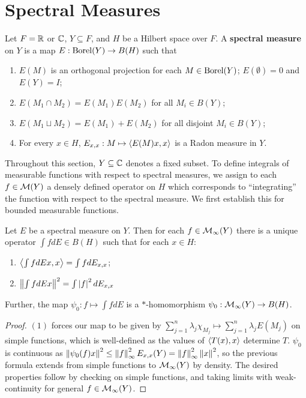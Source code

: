 \documentclass[10pt]{amsart}
\begin{document}
\section{Spectral Measures}
\begin{definition}
    Let $F = \mathbb{R}$ or $\mathbb{C}$, $Y \subseteq F$, and $H$ be a Hilbert space over $F$. A \textbf{spectral measure} on $Y$ is a map $E : \operatorname{Borel}(Y) \to B(H)$ such that
    \begin{enumerate}
        \item $E(M)$ is an orthogonal projection for each $M \in \operatorname{Borel}(Y)$; $E(\emptyset) = 0$ and $E(Y) = I$;
        \item $E(M_1 \cap M_2) = E(M_1)E(M_2)$ for all $M_i \in B(Y)$;
        \item $E(M_1 \sqcup M_2) = E(M_1) + E(M_2)$ for all disjoint $M_i \in B(Y)$;
        \item For every $x \in H$, $E_{x, x} : M \mapsto \left\langle E(M)x, x \right\rangle$ is a Radon measure in $Y$.
    \end{enumerate}
\end{definition}
Throughout this section, $Y \subseteq \mathbb{C}$ denotes a fixed subset. To define integrals of measurable functions with respect to spectral measures, we assign to each $f \in \mathcal{M}(Y)$ a densely defined operator on $H$ which corresponds to ``integrating'' the function with respect to the spectral measure. We first establish this for bounded measurable functions.
\begin{lemma}\label{bdint}
    Let $E$ be a spectral measure on $Y$. Then for each $f \in \mathcal{M}_\infty(Y)$ there is a unique operator $\int f dE \in B(H)$ such that for each $x \in H$:
    \begin{enumerate}
        \item $\left\langle \int f dEx, x \right\rangle = \int f dE_{x, x}$;
        \item $\left\| \int f dE x \right\|^2 = \int\left| f \right|^2 dE_{x, x}$
    \end{enumerate}
    Further, the map $\psi_0 : f \mapsto \int f dE$ is a $*$-homomorphism $\psi_0 : \mathcal{M}_\infty(Y) \to B(H)$.
\end{lemma}
\begin{proof}
    $(1)$ forces our map to be given by $\sum_{j = 1}^n \lambda_j \chi_{M_j} \mapsto \sum_{j = 1}^n \lambda_j E(M_j)$ on simple functions, which is well-defined as the values of $\left\langle T(x), x \right\rangle$ determine $T$. $\psi_0$ is continuous as $\left\| \psi_0(f)x \right\|^2 \leq \left\| f \right\|^2_\infty E_{x, x}(Y) = \left\| f \right\|_\infty^2\left\| x \right\|^2$, so the previous formula extends from simple functions to $\mathcal{M}_\infty(Y)$ by density. The desired properties follow by checking on simple functions, and taking limits with weak-continuity for general $f \in \mathcal{M}_\infty(Y)$.
\end{proof}
\end{document}
